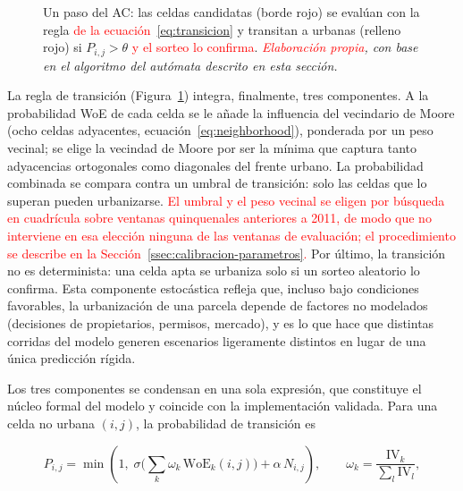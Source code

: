 \begin{figure}[htbp]
{}
  \caption{Un paso del AC: las celdas candidatas (borde rojo) se evalúan con la regla \textcolor{red}{de la ecuación~\ref{eq:transicion}} y transitan a urbanas (relleno rojo) si $P_{i,j}>\theta$ \textcolor{red}{y el sorteo lo confirma}. \textit{\textcolor{red}{Elaboración propia}, con base en el algoritmo del autómata descrito en esta sección.}}
  \label{fig:paso-ac}
\end{figure}

La regla de transición (Figura~\ref{fig:paso-ac}) integra, finalmente, tres componentes. A la probabilidad WoE de cada celda se le añade la influencia del vecindario de Moore (ocho celdas adyacentes, ecuación~\ref{eq:neighborhood}), ponderada por un peso vecinal; se elige la vecindad de Moore por ser la mínima que captura tanto adyacencias ortogonales como diagonales del frente urbano. La probabilidad combinada se compara contra un umbral de transición: solo las celdas que lo superan pueden urbanizarse. \textcolor{red}{El umbral y el peso vecinal se eligen por búsqueda en cuadrícula sobre ventanas quinquenales anteriores a 2011, de modo que no interviene en esa elección ninguna de las ventanas de evaluación; el procedimiento se describe en la Sección~\ref{ssec:calibracion-parametros}.} Por último, la transición no es determinista: una celda apta se urbaniza solo si un sorteo aleatorio lo confirma. Esta componente estocástica refleja que, incluso bajo condiciones favorables, la urbanización de una parcela depende de factores no modelados (decisiones de propietarios, permisos, mercado), y es lo que hace que distintas corridas del modelo generen escenarios ligeramente distintos en lugar de una única predicción rígida.

Los tres componentes se condensan en una sola expresión, que constituye el núcleo formal del modelo y coincide con la implementación validada. Para una celda no urbana $(i,j)$, la probabilidad de transición es

\begin{equation}
P_{i,j} = \min\!\left(1,\; \sigma\!\Big( \sum_{k} \omega_k\, \mathrm{WoE}_k(i,j) \Big) + \alpha\, N_{i,j} \right),
\qquad
\omega_k = \frac{\mathrm{IV}_k}{\sum_{l} \mathrm{IV}_l},
\label{eq:transicion}
\end{equation}

